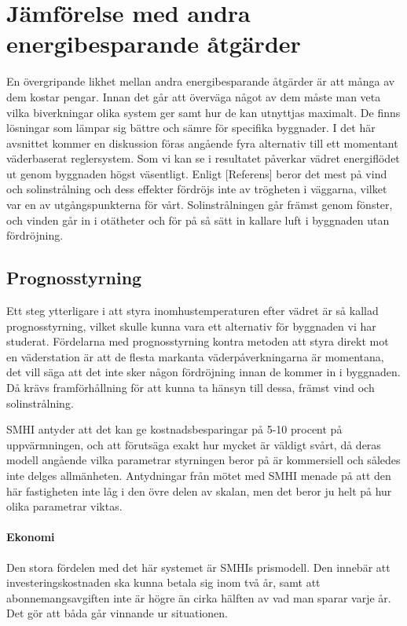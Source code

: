 \section{Jämförelse med andra energibesparande åtgärder}

En övergripande likhet mellan andra energibesparande åtgärder är att många av dem kostar pengar. Innan det går att överväga något av dem måste man veta vilka biverkningar olika system ger samt hur de kan utnyttjas maximalt. De finns lösningar som lämpar sig bättre och sämre för specifika byggnader. I det här avsnittet kommer en diskussion föras angående fyra alternativ till ett momentant väderbaserat reglersystem.
Som vi kan se i resultatet påverkar vädret energiflödet ut genom byggnaden högst väsentligt. Enligt [Referens] beror det mest på vind och solinstrålning och dess effekter fördröjs inte av trögheten i väggarna, vilket var en av utgångspunkterna för vårt. Solinstrålningen går främst genom fönster, och vinden går in i otätheter och för på så sätt in kallare luft i byggnaden utan fördröjning.
\subsection{Prognosstyrning}
Ett steg ytterligare i att styra inomhustemperaturen efter vädret är så kallad prognosstyrning, vilket skulle kunna vara ett alternativ för byggnaden vi har studerat.
Fördelarna med prognosstyrning kontra metoden att styra direkt mot en väderstation är att de flesta markanta väderpåverkningarna är momentana, det vill säga att det inte sker någon fördröjning innan de kommer in i byggnaden. Då krävs framförhållning för att kunna ta hänsyn till dessa, främst vind och solinstrålning.

SMHI antyder att det kan ge kostnadsbesparingar på 5-10 procent på uppvärmningen, och att förutsäga exakt hur mycket är väldigt svårt, då deras modell angående vilka parametrar styrningen beror på är kommersiell och således inte delges allmänheten.  Antydningar från mötet med SMHI menade på att den här fastigheten inte låg i den övre delen av skalan, men det beror ju helt på hur olika parametrar viktas.

\paragraph{Ekonomi}
Den stora fördelen med det här systemet är SMHIs prismodell. Den innebär att investeringskostnaden ska kunna betala sig inom två år, samt att abonnemangsavgiften inte är högre än cirka hälften av vad man sparar varje år. Det gör att båda går vinnande ur situationen.
